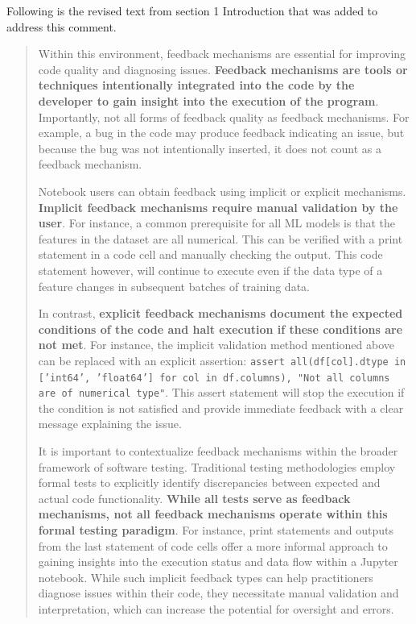 \documentclass[11pt,fleqn]{article}
\begin{document}
Following is the revised text from section 1 Introduction that was added to address this comment.

\begin{quote}
  Within this environment, feedback mechanisms are essential for improving code quality and diagnosing issues. \textbf{Feedback mechanisms are tools or techniques intentionally integrated into the code by the developer to gain insight into the execution of the program}. Importantly, not all forms of feedback quality as feedback mechanisms. For example, a bug in the code may produce feedback indicating an issue, but because the bug was not intentionally inserted, it does not count as a feedback mechanism.

  Notebook users can obtain feedback using implicit or explicit mechanisms. \textbf{Implicit feedback mechanisms require manual validation by the user}. For instance, a common prerequisite for all ML models is that the features in the dataset are all numerical. This can be verified with a print statement in a code cell and manually checking the output. This code statement however, will continue to execute even if the data type of a feature changes in subsequent batches of training data.

  In contrast, \textbf{explicit feedback mechanisms document the expected conditions of the code and halt execution if these conditions are not met}. For instance, the implicit validation method mentioned above can be replaced with an explicit assertion: \texttt{assert all(df[col].dtype in ['int64', 'float64'] for col in df.columns), "Not all columns are of numerical type"}. This assert statement will stop the execution if the condition is not satisfied and provide immediate feedback with a clear message explaining the issue.

  It is important to contextualize feedback mechanisms within the broader framework of software testing. Traditional testing methodologies employ formal tests to explicitly identify discrepancies between expected and actual code functionality. \textbf{While all tests serve as feedback mechanisms, not all feedback mechanisms operate within this formal testing paradigm}. For instance, print statements and outputs from the last statement of code cells offer a more informal approach to gaining insights into the execution status and data flow within a Jupyter notebook. While such implicit feedback types can help practitioners diagnose issues within their code, they necessitate manual validation and interpretation, which can increase the potential for oversight and errors.
\end{quote}
\end{document}
